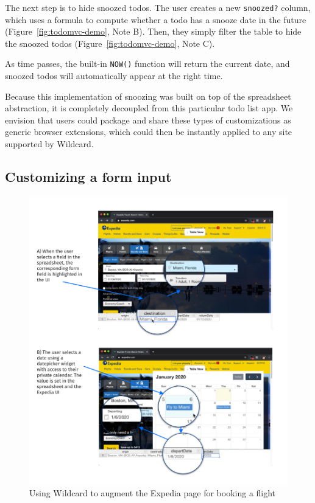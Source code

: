 \documentclass[english,submission]{programming}
\begin{document}
The next step is to hide snoozed todos. The user creates a new
\texttt{snoozed?} column, which uses a formula to compute whether a todo
has a snooze date in the future{ (Figure~\ref{fig:todomvc-demo}, Note
B)}. Then, they simply filter the table to hide the snoozed todos{
(Figure~\ref{fig:todomvc-demo}, Note C)}.

As time passes, the built-in \texttt{NOW()} function will return the
current date, and snoozed todos will automatically appear at the right
time.

Because this implementation of snoozing was built on top of the
spreadsheet abstraction, it is completely decoupled from this particular
todo list app. We envision that users could package and share these
types of customizations as generic browser extensions, which could then
be instantly applied to any site supported by Wildcard.

\hypertarget{customizing-a-form-input}{%
\subsection{Customizing a form input}\label{customizing-a-form-input}}

\begin{figure}
\hypertarget{fig:expedia-demo}{%
\centering
\includegraphics{media/expedia-demo-300dpi.png}
\caption{Using Wildcard to augment the Expedia page for booking a
flight}\label{fig:expedia-demo}
}
\end{figure}
\end{document}
